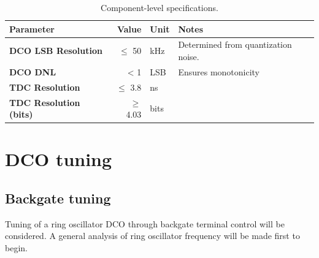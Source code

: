 \documentclass[10pt,a4paper]{article}
\begin{document}
		\scriptsize
		\begin{table}[h!]
			\centering
			\def\arraystretch{1.5}		
			\setlength\arrayrulewidth{0.75pt}
			\setlength{\tabcolsep}{1em} %
			\begin{tabular}{|l|r|l|l|}
				\hline 
				\rule[-1ex]{0pt}{2.5ex} \cellcolor{gray!40}\textbf{Parameter} & \cellcolor{gray!40}\textbf{Value} & \cellcolor{gray!40}\textbf{Unit }& \cellcolor{gray!40}\textbf{Notes}\\ 
				\hline 
				\rule[-1ex]{0pt}{2.5ex} \textbf{DCO LSB Resolution}  & $\leq$ 50  & kHz & Determined from quantization noise.\\ 
				\hline 
				\rule[-1ex]{0pt}{2.5ex} \textbf{DCO DNL} & < 1 & LSB & Ensures monotonicity \\ 
				\hline 
				\rule[-1ex]{0pt}{2.5ex} \textbf{TDC Resolution} & $\leq$ 3.8  & ns & \\ 
				\hline 
				\rule[-1ex]{0pt}{2.5ex} \textbf{TDC Resolution (bits)} & $\geq$ 4.03 &bits & \\ 
				\hline 
			\end{tabular} 
			\caption{Component-level specifications.}
		\end{table}   

	\FloatBarrier
	\flushleft
	\section{DCO tuning}
	\subsection{Backgate tuning}
	\normalsize
	Tuning of a ring oscillator DCO through backgate terminal control will be considered. A general analysis of ring oscillator frequency will be made first to begin.
\end{document}
